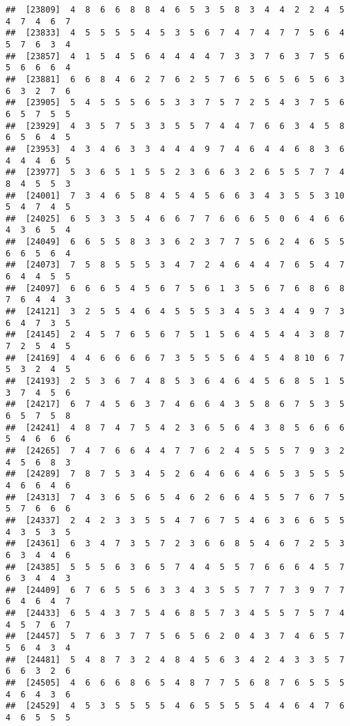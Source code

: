 \documentclass[
]{book}
\begin{document}
\begin{verbatim}
##  [23809]  4  8  6  6  8  8  4  6  5  3  5  8  3  4  4  2  2  4  5  4  7  4  6  7
##  [23833]  4  5  5  5  5  4  5  3  5  6  7  4  7  4  7  7  5  6  4  5  7  6  3  4
##  [23857]  4  1  5  4  5  6  4  4  4  4  7  3  3  7  6  3  7  5  6  5  6  6  6  4
##  [23881]  6  6  8  4  6  2  7  6  2  5  7  6  5  6  5  6  5  6  3  6  3  2  7  6
##  [23905]  5  4  5  5  5  6  5  3  3  7  5  7  2  5  4  3  7  5  6  6  5  7  5  5
##  [23929]  4  3  5  7  5  3  3  5  5  7  4  4  7  6  6  3  4  5  8  6  5  6  4  5
##  [23953]  4  3  4  6  3  3  4  4  4  9  7  4  6  4  4  6  8  3  6  4  4  4  6  5
##  [23977]  5  3  6  5  1  5  5  2  3  6  6  3  2  6  5  5  7  7  4  8  4  5  5  3
##  [24001]  7  3  4  6  5  8  4  5  4  5  6  6  3  4  3  5  5  3 10  5  4  7  4  5
##  [24025]  6  5  3  3  5  4  6  6  7  7  6  6  6  5  0  6  4  6  6  4  3  6  5  4
##  [24049]  6  6  5  5  8  3  3  6  2  3  7  7  5  6  2  4  6  5  5  6  6  5  6  4
##  [24073]  7  5  8  5  5  5  3  4  7  2  4  6  4  4  7  6  5  4  7  6  4  4  5  5
##  [24097]  6  6  6  5  4  5  6  7  5  6  1  3  5  6  7  6  8  6  8  7  6  4  4  3
##  [24121]  3  2  5  5  4  6  4  5  5  5  3  4  5  3  4  4  9  7  3  6  4  7  3  5
##  [24145]  2  4  5  7  6  5  6  7  5  1  5  6  4  5  4  4  3  8  7  7  2  5  4  5
##  [24169]  4  4  6  6  6  6  7  3  5  5  5  6  4  5  4  8 10  6  7  5  3  2  4  5
##  [24193]  2  5  3  6  7  4  8  5  3  6  4  6  4  5  6  8  5  1  5  3  7  4  5  6
##  [24217]  6  7  4  5  6  3  7  4  6  6  4  3  5  8  6  7  5  3  5  6  5  7  5  8
##  [24241]  4  8  7  4  7  5  4  2  3  6  5  6  4  3  8  5  6  6  6  5  4  6  6  6
##  [24265]  7  4  7  6  6  4  4  7  7  6  2  4  5  5  5  7  9  3  2  4  5  6  8  3
##  [24289]  7  8  7  5  3  4  5  2  6  4  6  6  4  6  5  3  5  5  5  4  6  6  4  6
##  [24313]  7  4  3  6  5  6  5  4  6  2  6  6  4  5  5  7  6  7  5  5  7  6  6  6
##  [24337]  2  4  2  3  3  5  5  4  7  6  7  5  4  6  3  6  6  5  5  4  3  5  3  5
##  [24361]  6  3  4  7  3  5  7  2  3  6  6  8  5  4  6  7  2  5  3  6  3  4  4  6
##  [24385]  5  5  5  6  3  6  5  7  4  4  5  5  7  6  6  6  4  5  7  6  3  4  4  3
##  [24409]  6  7  6  5  5  6  3  3  4  3  5  5  7  7  7  3  9  7  7  6  4  6  4  7
##  [24433]  6  5  4  3  7  5  4  6  8  5  7  3  4  5  5  7  5  7  4  4  5  7  6  7
##  [24457]  5  7  6  3  7  7  5  6  5  6  2  0  4  3  7  4  6  5  7  5  6  4  3  4
##  [24481]  5  4  8  7  3  2  4  8  4  5  6  3  4  2  4  3  3  5  7  6  6  3  2  6
##  [24505]  4  6  6  6  8  6  5  4  8  7  7  5  6  8  7  6  5  5  5  4  6  4  3  6
##  [24529]  4  5  3  5  5  5  5  4  6  5  5  5  5  4  4  6  4  7  6  4  6  5  5  5

\end{verbatim}
\end{document}
